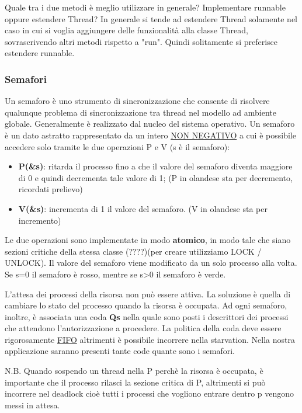 \documentclass{article}
\begin{document}
\noindent Quale tra i due metodi è meglio utilizzare in generale? Implementare runnable oppure estendere Thread? In generale si tende ad estendere Thread solamente nel caso 
in cui si voglia aggiungere delle funzionalità alla classe Thread, sovrascrivendo altri metodi rispetto a "run". Quindi solitamente si preferisce estendere runnable.

\subsubsection{Semafori}
\noindent Un semaforo è uno strumento di sincronizzazione che consente di risolvere qualunque problema di sincronizzazione tra thread
nel modello ad ambiente globale. Generalmente è realizzato dal nucleo del sistema operativo. Un semaforo è un dato astratto rappresentato
da un intero \underline{NON NEGATIVO} a cui è possibile accedere solo tramite le due operazioni P e V (s è il semaforo):
\begin{itemize}
    \item \textbf{P(\&s)}: ritarda il processo fino a che il valore del semaforo diventa maggiore di 0 e quindi decrementa tale valore di 1;
    (P in olandese sta per decremento, ricordati prelievo)
    \item \textbf{V(\&s)}: incrementa di 1 il valore del semaforo. (V in olandese sta per incremento)
\end{itemize}

\noindent Le due operazioni sono implementate in modo \textbf{atomico}, in modo tale che siano sezioni 
critiche della stessa classe (????)(per creare utilizziamo LOCK / UNLOCK).
Il valore del semaforo viene modificato da un solo processo alla volta. Se s=0 il semaforo è rosso, mentre se s>0 il semaforo è verde.
\medskip

\noindent L'attesa dei processi della risorsa non può essere attiva. La soluzione è quella di cambiare lo stato del processo quando la
 risorsa è occupata. 
Ad ogni semaforo, inoltre, è associata una coda \textbf{Qs} nella quale sono posti i descrittori dei processi che attendono 
l'autorizzazione a procedere. La politica della coda deve essere rigorosamente \underline{FIFO} altrimenti è possibile incorrere nella starvation.
Nella nostra applicazione saranno presenti tante code quante sono i semafori.
\medskip

\noindent N.B. Quando sospendo un thread nella P perchè la risorsa è occupata, è importante che il processo rilasci la sezione critica 
di P, altrimenti si può incorrere nel deadlock cioè tutti i processi che vogliono entrare dentro p vengono messi in attesa.
\end{document}
